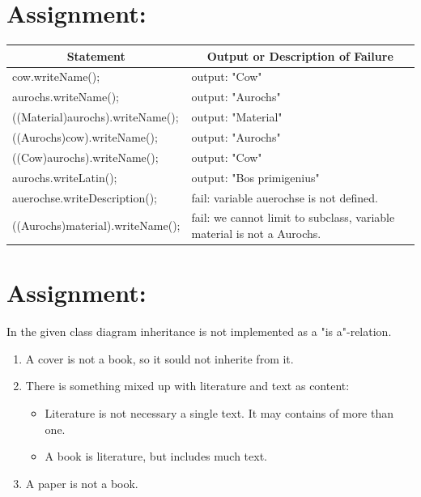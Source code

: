 \documentclass[a4paper,12pt,oneside]{scrreprt}
\begin{document}
	\setcounter{chapter}{2} %
	\section{Assignment:}
	
    
	\begin{table}[h]
		\centering
		\resizebox{\textwidth}{!}
		{%
			\begin{tabular}{|l|l|}
				\hline
				\multicolumn{1}{|c|}{\textbf{Statement}} & \multicolumn{1}{c|}{\textbf{Output or Description of Failure}} \\ \hline
				cow.writeName();                         & output: "Cow"         \\ \hline
				aurochs.writeName();                     & output: "Aurochs"     \\ \hline
				((Material)aurochs).writeName();         & output: "Material"    \\ \hline
				((Aurochs)cow).writeName();              & output: "Aurochs"     \\ \hline
				((Cow)aurochs).writeName();              & output: 
                "Cow"         \\ \hline
				aurochs.writeLatin();                    & output: "Bos primigenius"  \\ \hline
				auerochse.writeDescription();              & fail:
                variable auerochse is not defined.      \\ \hline
				((Aurochs)material).writeName();         & fail: we cannot limit to subclass, variable material is not a Aurochs.
				                                                                 \\ \hline
			\end{tabular}
		}
	\end{table}
	
	\section{Assignment:}
    
    In the given class diagram inheritance is not implemented as a "is a"-relation. 
    
    \begin{enumerate}
        \item A cover is not a book, so it sould not inherite from it.
        \item There is something mixed up with literature and text as content:
        \begin{itemize}
            \item Literature is not necessary a single text. It may contains of more than one.
            \item A book is literature, but includes much text.
        \end{itemize}
        \item A paper is not a book.
    \end{enumerate}
\end{document}
